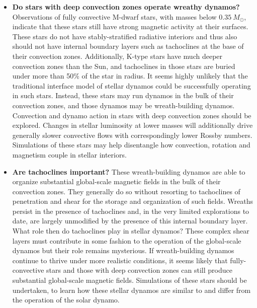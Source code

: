 \begin{itemize}
   \item \textbf{Do stars with deep convection zones operate wreathy dynamos?}
     Observations of fully convective M-dwarf stars, with masses below
     $0.35\:M_\odot$, indicate that these stars still have strong
     magnetic activity at their surfaces.  These stars do not have
     stably-stratified radiative interiors and thus also should not
     have internal boundary layers such as tachoclines at the base of
     their convection zones.   Additionally, K-type stars have much
     deeper convection zones than the Sun, and tachoclines in those
     stars are buried under more than 
     50\% of the star in radius.  It seems highly unlikely that the
     traditional interface model of stellar dynamos could be
     successfully operating in such stars.  Instead, these stars may
     run dynamos in the bulk of their convection zones, and those
     dynamos may be wreath-building dynamos.  Convection and dynamo
     action in stars with deep convection zones should be explored.
     Changes in stellar luminosity at lower masses will additionally
     drive generally slower convective flows with correspondingly
     lower Rossby numbers.  Simulations of these stars may help
     disentangle how convection, rotation and magnetism couple in
     stellar interiors.

   \item \textbf{Are tachoclines important?}  These wreath-building
     dynamos are able to organize substantial global-scale magnetic
     fields in the bulk of their convection zones.  They generally do
     so without resorting to tachoclines of penetration and shear for
     the storage and organization of such fields.  Wreaths persist in
     the presence of tachoclines and, in the very limited explorations
     to date, are largely unmodified by the presence of this internal
     boundary layer.  What role then do tachoclines play in stellar
     dynamos?  These complex shear layers must contribute in some
     fashion to the operation of the global-scale dynamos but their
     role remains mysterious.  If wreath-building dynamos continue to
     thrive under more realistic conditions, it seems likely that
     fully-convective stars and those with deep convection zones can
     still produce substantial global-scale magnetic fields.
     Simulations of these stars should be undertaken, to learn how
     these stellar dynamos are similar to and differ from the
     operation of the solar dynamo. 

\end{itemize}


